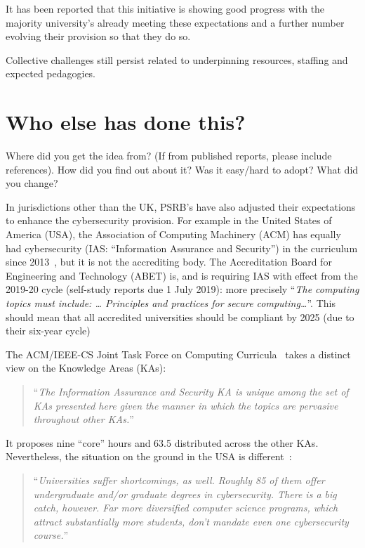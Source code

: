 \documentclass[sigconf]{acmart}
\begin{document}
It has been reported that this initiative is showing good progress \cite{Cricketal2019} with the majority university's already meeting these expectations and a further number evolving their provision so that they do so.

Collective challenges still persist related to underpinning resources, staffing and expected pedagogies.

\section {Who else has done this?}	Where did you get the idea from? (If from published reports, please include references). How did you find out about it? Was it easy/hard to adopt? What did you change?

In jurisdictions other than the UK, PSRB's have also adjusted their expectations to enhance the cybersecurity provision. For example in the United States of America (USA), the Association of Computing Machinery (ACM) has equally had cybersecurity (IAS: ``Information Assurance and Security'') in the curriculum since 2013~\cite{ACM2013a}, but it is not the accrediting body. The Accreditation Board for Engineering and Technology (ABET) is, and is requiring IAS with effect from the 2019-20 cycle (self-study reports due 1 July 2019): more precisely \cite[Table 3]{Oudshoornetal2018a} ``{\emph{The computing topics must include: \dots{} Principles and practices for secure computing\dots}}''. This should mean that  all accredited universities should be compliant by 2025 (due to their six-year cycle)

The ACM/IEEE-CS Joint Task Force on Computing Curricula~\cite[p.~97]{ACM2013a} takes a distinct view on the Knowledge Areas (KAs):

\begin{quote}
	``{\emph{The Information Assurance and Security KA is unique among the set of KAs presented here
			given the manner in which the topics are pervasive throughout other KAs.}}''
\end{quote}

It proposes nine ``core'' hours and 63.5 distributed across the other KAs. Nevertheless, the situation on the ground in the USA is different~\cite{Ackerman2019a}:

\begin{quote}
	``{\emph{Universities suffer shortcomings, as well. Roughly 85 of them offer undergraduate and/or graduate degrees in cybersecurity. There is a big catch, however. Far more diversified computer science programs, which attract substantially more students, don't mandate even one cybersecurity course.}}''
\end{quote}
\end{document}
